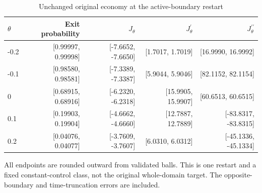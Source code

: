 \begin{table}[htbp]
\centering\footnotesize
\caption{Unchanged original economy at the active-boundary restart}\label{tab:stopping30}
\begin{tabular}{lrrrr}\toprule
$\theta$ & Exit probability & $J_\theta$ & $J_\theta^{\prime}$ & $J_\theta^{\prime\prime}$ \\\midrule
-0.2 & [0.99997, 0.99998] & [-7.6652, -7.6650] & [1.7017, 1.7019] & [16.9990, 16.9992] \\
-0.1 & [0.98580, 0.98581] & [-7.3389, -7.3387] & [5.9044, 5.9046] & [82.1152, 82.1154] \\
0 & [0.68915, 0.68916] & [-6.2320, -6.2318] & [15.9905, 15.9907] & [60.6513, 60.6515] \\
0.1 & [0.19903, 0.19904] & [-4.6662, -4.6660] & [12.7887, 12.7889] & [-83.8317, -83.8315] \\
0.2 & [0.04076, 0.04077] & [-3.7609, -3.7607] & [6.0310, 6.0312] & [-45.1336, -45.1334] \\
\bottomrule\end{tabular}
\par\smallskip\begin{minipage}{.98\textwidth}\footnotesize All endpoints are rounded outward from validated balls. This is one restart and a fixed constant-control class, not the original whole-domain target. The opposite-boundary and time-truncation errors are included.\end{minipage}
\end{table}
